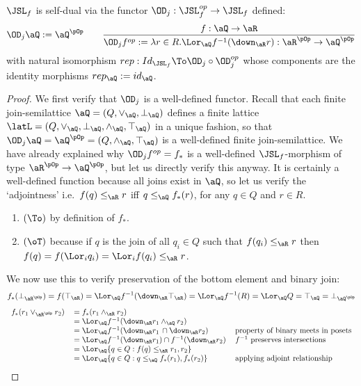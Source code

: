 \documentclass{article}
\begin{document}
\begin{theorem}
\label{thm:jsl_self_dual}
$\JSL_f$ is self-dual via the functor $\OD_j : \JSL_f^{op} \to \JSL_f$ defined:
\[
\OD_j\aQ := \aQ^{\pOp}
\qquad
\dfrac
{f: \aQ \to \aR}
{\OD_j f^{op} := \lambda r \in R.\Lor_\aQ f^{-1}(\down_\aR r) : \aR^{\pOp} \to \aQ^{\pOp}}
\]
with natural isomorphism $rep : Id_{\JSL_f} \To \OD_j \circ \OD_j^{op}$ whose components are the identity morphisms $rep_\aQ := id_\aQ$.
\end{theorem}

\begin{proof}
We first verify that $\OD_j$ is a well-defined functor. Recall that each finite join-semilattice $\aQ = (Q,\lor_\aQ,\bot_\aQ)$ defines a finite lattice $\latL = (Q,\lor_\aQ,\bot_\aQ,\land_\aQ,\top_\aQ)$ in a unique fashion, so that $\OD_j\aQ = \aQ^{\pOp} = (Q,\land_\aQ,\top_\aQ)$ is a well-defined finite join-semilattice. We have already explained why $\OD_j f^{op} = f_*$ is a well-defined $\JSL_f$-morphism of type $\aR^{\pOp} \to \aQ^{\pOp}$, but let us directly verify this anyway. It is certainly a well-defined function because all joins exist in $\aQ$, so let us verify the `adjointness' i.e.\ $f(q) \leq_\aR r$ iff $q \leq_\aQ f_*(r)$, for any $q \in Q$ and $r \in R$.
\begin{enumerate}
\item
$(\To)$ by definition of $f_*$.
\item
$(\oT)$ because if $q$ is the join of all $q_i \in Q$ such that $f(q_i) \leq_\aR r$ then $f(q) = f(\Lor_i q_i) = \Lor_i f(q_i) \leq_\aR r$.
\end{enumerate}
We now use this to verify preservation of the bottom element and binary join:
\[
f_*(\bot_{\aR^{\pOp}}) 
= f(\top_\aR) 
= \Lor_\aQ f^{-1}(\down_\aR \top_\aR) 
= \Lor_\aQ f^{-1} (R)
= \Lor_\aQ Q
= \top_\aQ
= \bot_{\aQ^{\pOp}}
\]
\[
\begin{tabular}{lll}
$f_*(r_1 \lor_{\aR^{\pOp}} r_2)$
&
$= f_*(r_1 \land_\aR r_2)$
\\&
$= \Lor_\aQ f^{-1}(\down_\aR r_1 \land_\aQ r_2)$
\\&
$= \Lor_\aQ f^{-1}(\down_\aR r_1 \, \cap \down_\aR r_2)$
& property of binary meets in posets
\\&
$= \Lor_\aQ f^{-1}(\down_\aR r_1) \cap f^{-1}(\down_\aR r_2)$
& $f^{-1}$ preserves intersections
\\&
$= \Lor_\aQ \{ q \in Q : f(q) \leq_\aR  r_1, r_2 \}$
\\&
$= \Lor_\aQ \{ q \in Q : q \leq_\aQ  f_*(r_1), f_*(r_2) \}$
& applying adjoint relationship

\end{tabular}\]
\end{proof}
\end{document}
